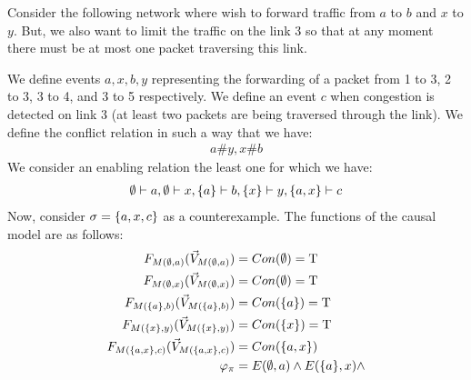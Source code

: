 \begin{example}
    Consider the following network where wish to forward traffic from $a$ to $b$ and $x$ to $y$.
    But, we also want to limit the traffic on the link 3 so that at any moment
    there must be at most one packet traversing this link.
    \begin{center}
    \end{center}
    We define events $a,x,b,y$ representing the forwarding of a packet from
    1 to 3, 2 to 3, 3 to 4, and 3 to 5 respectively.
    We define an event $c$ when congestion is detected on link 3 (at least two packets are being traversed through the link).
    We define the conflict relation in such a way that we have:
    \begin{align*}
        a \# y, x\# b
    \end{align*}
    We consider an enabling relation the least one for which we have:
    \begin{align*}
        \emptyset \vdash a, \emptyset \vdash x, \{a\} \vdash b, \{x\} \vdash y,
        \{a,x\} \vdash c
    \end{align*}
    Now, consider $\sigma = \{a,x,c\}$ as a counterexample.
    The functions of the causal model are as follows:
    \begin{align*}
        \f{M(\e,a)}      & = Con(\e) = \T                     \\
        \f{M(\e,x)}      & = Con(\e) = \T                     \\
        \f{M(\s{a},b)}   & = Con(\s{a}) = \T                  \\
        \f{M(\s{x},y)}   & = Con(\s{x}) = \T                  \\
        \f{M(\s{a,x},c)} & = Con(\s{a,x})                     \\
        \varphi_{\pi}    & = E(\e,a) \wedge E(\s{a},x) \wedge

\end{align*}
\end{example}

